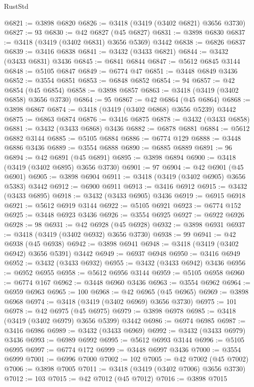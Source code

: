 \begin{lexlean}{RustStd}
\begin{coremodule}
@6821 := @3898 @6820
@6826 := @3418 (@3419 (@3402 @6821) @3656 @3730)
@6827 := 93
@6830 := @42 @6827 (@45 @6827)
@6831 := @3898 @6830
@6837 := @3418 (@3419 (@3402 @6831) @3656 @5369) @3442
@6838 := @6826 @6837
@6839 := @3416 @6838
@6841 := @3432 (@3433 @6821)
@6844 := @3432 (@3433 @6831) @3436
@6845 := @6841 @6844
@6847 := @5612 @6845 @3144
@6848 := @5105 @6847
@6849 := @6774 @47
@6851 := @3448 @6849 @3436
@6852 := @3554 @6851
@6853 := @6848 @6852
@6854 := 94
@6857 := @42 @6854 (@45 @6854)
@6858 := @3898 @6857
@6863 := @3418 (@3419 (@3402 @6858) @3656 @3730)
@6864 := 95
@6867 := @42 @6864 (@45 @6864)
@6868 := @3898 @6867
@6874 := @3418 (@3419 (@3402 @6868) @3656 @5239) @3442
@6875 := @6863 @6874
@6876 := @3416 @6875
@6878 := @3432 (@3433 @6858)
@6881 := @3432 (@3433 @6868) @3436
@6882 := @6878 @6881
@6884 := @5612 @6882 @3144
@6885 := @5105 @6884
@6886 := @6774 @129
@6888 := @3448 @6886 @3436
@6889 := @3554 @6888
@6890 := @6885 @6889
@6891 := 96
@6894 := @42 @6891 (@45 @6891)
@6895 := @3898 @6894
@6900 := @3418 (@3419 (@3402 @6895) @3656 @3730)
@6901 := 97
@6904 := @42 @6901 (@45 @6901)
@6905 := @3898 @6904
@6911 := @3418 (@3419 (@3402 @6905) @3656 @5383) @3442
@6912 := @6900 @6911
@6913 := @3416 @6912
@6915 := @3432 (@3433 @6895)
@6918 := @3432 (@3433 @6905) @3436
@6919 := @6915 @6918
@6921 := @5612 @6919 @3144
@6922 := @5105 @6921
@6923 := @6774 @152
@6925 := @3448 @6923 @3436
@6926 := @3554 @6925
@6927 := @6922 @6926
@6928 := 98
@6931 := @42 @6928 (@45 @6928)
@6932 := @3898 @6931
@6937 := @3418 (@3419 (@3402 @6932) @3656 @3730)
@6938 := 99
@6941 := @42 @6938 (@45 @6938)
@6942 := @3898 @6941
@6948 := @3418 (@3419 (@3402 @6942) @3656 @5391) @3442
@6949 := @6937 @6948
@6950 := @3416 @6949
@6952 := @3432 (@3433 @6932)
@6955 := @3432 (@3433 @6942) @3436
@6956 := @6952 @6955
@6958 := @5612 @6956 @3144
@6959 := @5105 @6958
@6960 := @6774 @167
@6962 := @3448 @6960 @3436
@6963 := @3554 @6962
@6964 := @6959 @6963
@6965 := 100
@6968 := @42 @6965 (@45 @6965)
@6969 := @3898 @6968
@6974 := @3418 (@3419 (@3402 @6969) @3656 @3730)
@6975 := 101
@6978 := @42 @6975 (@45 @6975)
@6979 := @3898 @6978
@6985 := @3418 (@3419 (@3402 @6979) @3656 @5399) @3442
@6986 := @6974 @6985
@6987 := @3416 @6986
@6989 := @3432 (@3433 @6969)
@6992 := @3432 (@3433 @6979) @3436
@6993 := @6989 @6992
@6995 := @5612 @6993 @3144
@6996 := @5105 @6995
@6997 := @6774 @172
@6999 := @3448 @6997 @3436
@7000 := @3554 @6999
@7001 := @6996 @7000
@7002 := 102
@7005 := @42 @7002 (@45 @7002)
@7006 := @3898 @7005
@7011 := @3418 (@3419 (@3402 @7006) @3656 @3730)
@7012 := 103
@7015 := @42 @7012 (@45 @7012)
@7016 := @3898 @7015

\end{coremodule}
\end{lexlean}
